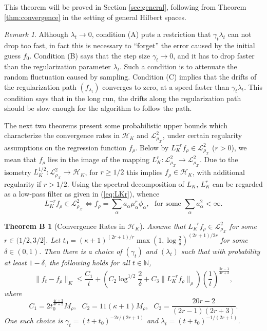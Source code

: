 \documentclass[twoside,11pt]{amsart}
\theoremstyle{theorem}
\newtheorem*{thmb}{Theorem B}
\theoremstyle{definition}
\theoremstyle{remark}
\newtheorem{rem}[thm]{Remark}
\newcommand{\DS}{\displaystyle}
\def\L{{\mathscr L}}
\def\L2{{\mathscr L}^2_{\rho_\X}}
\def\H{{\mathscr H}}
\def\X{{\mathscr X}}
\def\N{{\mathbb N}}
\def\t{t_0}
\def\al{\alpha}
\def\la{\lambda}
\def\ka{\kappa}
\def\ga{\gamma}
\begin{document}
This theorem will be proved in Section \ref{sec:general}, following from Theorem \ref{thm:convergence} in the setting of general Hilbert spaces.  

\begin{rem}
Although $\la_t \to 0$, condition (A) puts a restriction that $\ga_t\la_t$ can not drop too fast, in fact this is necessary to ``forget'' the error 
caused by the initial guess $f_0$. Condition (B) says that the step size $\ga_t \to 0$, and it has to drop faster than the regularization parameter $\la_t$. 
Such a condition is to attenuate the random fluctuation caused by sampling. 
Condition (C) implies that the drifts of the regularization path $(f_{\la_t})$ converges to zero, at a speed faster than $\ga_t \la_t$. This condition
says that in the long run, the drifts along the regularization path should be slow enough for the algorithm to follow the path. 
\end{rem}

The next two theorems present some probabilistic upper bounds which characterize the convergence rates in $\H_K$ and $\L2$, under certain regularity assumptions
on the regression function $f_\rho$. Below by $L_K^{-r} f_\rho \in \L2$ ($r>0$), we mean that $f_\rho$ lies in the image of the mapping $L_K^r:\L2\to \L2$. 
Due to the isometry $L_K^{1/2}:\L2 \to \H_K$, for $r\geq 1/2$ this implies $f_\rho \in \H_K$, with additional regularity if $r>1/2$. Using the spectral decomposition of $L_K$,
$L_K^{r}$ can be regarded as a low-pass filter as given in (\ref{eq:LKr}), whence
\[ L_K^{-r} f_\rho \in \L2 \Leftrightarrow f_\rho=\sum_{\al} a_\al \mu_\al^r \phi_\al,\ \ \  \mbox{for some $\sum_\al a_\al^2 <\infty$}.\]


\begin{thmb} [Convergence Rates in $\H_K$] 
Assume that $L_K^{-r} f_\rho\in \L2$ for some $r\in (1/2,3/2]$. Let $\DS \t= (\ka+1)^{(2r+1)/r} \max(1,\log \frac{2}{\delta})^{(2r+1)/2r}$ 
for some $\delta\in (0,1)$.
Then there is a choice of $(\ga_t)$ and $(\la_t)$ such that with probability at least $1-\delta$, 
the following holds for all $t\in \N$, 
\[ \|f_t - f_\rho \|_K \leq \frac{C_1}{t} + ( C_2 \log^{1/2}\frac{2}{\delta} + C_3 \| L^{-r}_K f_\rho \|_\rho ) 
\left(\frac{1}{t}\right)^{\frac{2r-1}{4r+2}}, \]
where 
\[ C_1= 2\t^{\frac{4r+3}{4r+2}} M_\rho, \ \ \ C_2 = 11 (\kappa+1) M_\rho, \ \ \  C_3 = \frac{20r-2}{(2r-1)(2r+3)}. \]
One such choice is $\ga_t = (t+\t)^{-2r/(2r+1)}$ and $\la_t = (t+\t)^{-1/(2r+1)}$.
\end{thmb}
\end{document}

